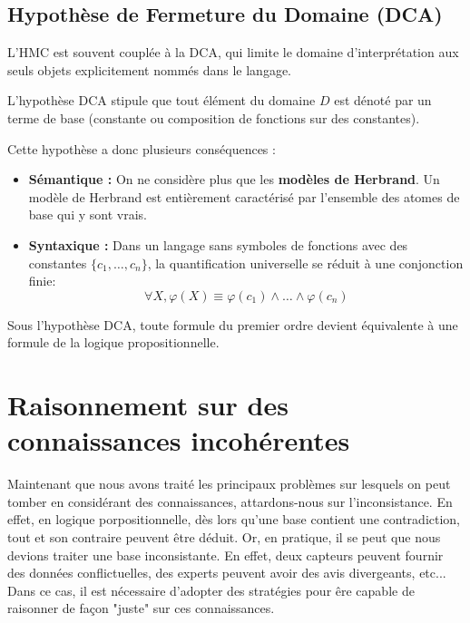 \subsection{Hypothèse de Fermeture du Domaine (DCA)}

L'HMC est souvent couplée à la DCA, qui limite le domaine d'interprétation aux seuls objets explicitement nommés dans le langage.

\begin{definition}[DCA]
    L'hypothèse DCA stipule que tout élément du domaine $D$ est dénoté par un terme de base (constante ou composition de 
    fonctions sur des constantes). 
\end{definition}

Cette hypothèse a donc plusieurs conséquences : 
\begin{itemize}
    \item \textbf{Sémantique :} On ne considère plus que les \textbf{modèles de Herbrand}. Un modèle de Herbrand est entièrement caractérisé par l'ensemble des atomes de base qui y sont vrais.
    \item \textbf{Syntaxique :} Dans un langage sans symboles de fonctions avec des constantes $\{c_1, \dots, c_n\}$, la quantification universelle se réduit à une conjonction finie:
    \[ \forall X, \varphi(X) \equiv \varphi(c_1) \land \dots \land \varphi(c_n) \]
\end{itemize}

Sous l'hypothèse DCA, toute formule du premier ordre devient équivalente à une formule de la logique propositionnelle.


\section{Raisonnement sur des connaissances incohérentes}

Maintenant que nous avons traité les principaux problèmes sur lesquels 
on peut tomber en considérant des connaissances, attardons-nous sur l'inconsistance. 
En effet, en logique porpositionnelle, dès lors qu'une base contient une contradiction, 
tout et son contraire peuvent être déduit. 
Or, en pratique, il se peut que nous devions traiter une base inconsistante. En effet, deux 
capteurs peuvent fournir des données conflictuelles, des experts peuvent avoir des avis divergeants, etc... 
Dans ce cas, il est nécessaire d'adopter des stratégies pour êre capable de raisonner 
de façon "juste" sur ces connaissances. 


